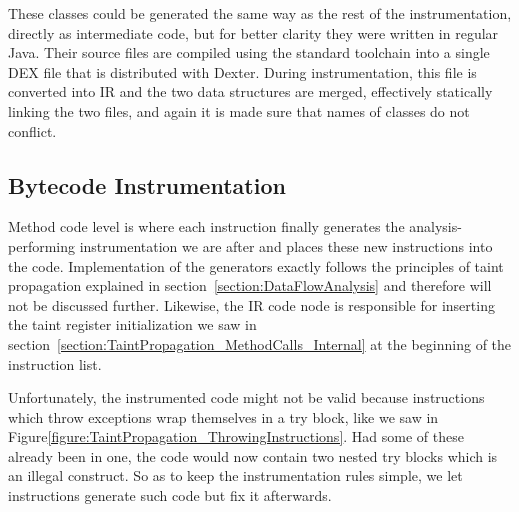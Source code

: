 \documentclass[12pt,twoside,notitlepage]{report}
\begin{document}
These classes could be generated the same way as the rest of the instrumentation, directly as intermediate code, but for better clarity they were written in regular Java. Their source files are compiled using the standard toolchain into a single DEX file that is distributed with Dexter. During instrumentation, this file is converted into IR and the two data structures are merged, effectively statically linking the two files, and again it is made sure that names of classes do not conflict.

\subsection{Bytecode Instrumentation}

Method code level is where each instruction finally generates the analysis-performing instrumentation we are after and places these new instructions into the code. Implementation of the generators exactly follows the principles of taint propagation explained in section~\ref{section:DataFlowAnalysis} and therefore will not be discussed further. Likewise, the IR code node is responsible for inserting the taint register initialization we saw in section~\ref{section:TaintPropagation_MethodCalls_Internal} at the beginning of the instruction list.

Unfortunately, the instrumented code might not be valid because instructions which throw exceptions wrap themselves in a try block, like we saw in Figure\ref{figure:TaintPropagation_ThrowingInstructions}. Had some of these already been in one, the code would now contain two nested try blocks which is an illegal construct. So as to keep the instrumentation rules simple, we let instructions generate such code but fix it afterwards.
\end{document}
